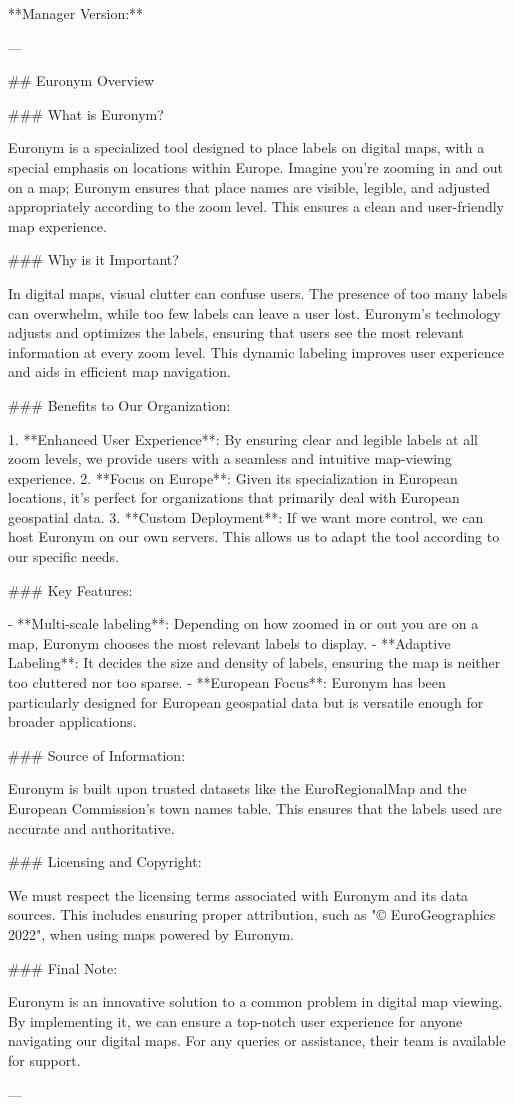 **Manager Version:**

---

## Euronym Overview

### What is Euronym?

Euronym is a specialized tool designed to place labels on digital maps, with a special emphasis on locations within Europe. Imagine you're zooming in and out on a map; Euronym ensures that place names are visible, legible, and adjusted appropriately according to the zoom level. This ensures a clean and user-friendly map experience.

### Why is it Important?

In digital maps, visual clutter can confuse users. The presence of too many labels can overwhelm, while too few labels can leave a user lost. Euronym's technology adjusts and optimizes the labels, ensuring that users see the most relevant information at every zoom level. This dynamic labeling improves user experience and aids in efficient map navigation.

### Benefits to Our Organization:

1. **Enhanced User Experience**: By ensuring clear and legible labels at all zoom levels, we provide users with a seamless and intuitive map-viewing experience.
2. **Focus on Europe**: Given its specialization in European locations, it's perfect for organizations that primarily deal with European geospatial data.
3. **Custom Deployment**: If we want more control, we can host Euronym on our own servers. This allows us to adapt the tool according to our specific needs.

### Key Features:

- **Multi-scale labeling**: Depending on how zoomed in or out you are on a map, Euronym chooses the most relevant labels to display.
- **Adaptive Labeling**: It decides the size and density of labels, ensuring the map is neither too cluttered nor too sparse.
- **European Focus**: Euronym has been particularly designed for European geospatial data but is versatile enough for broader applications.

### Source of Information:

Euronym is built upon trusted datasets like the EuroRegionalMap and the European Commission's town names table. This ensures that the labels used are accurate and authoritative.

### Licensing and Copyright:

We must respect the licensing terms associated with Euronym and its data sources. This includes ensuring proper attribution, such as "© EuroGeographics 2022", when using maps powered by Euronym.

### Final Note:

Euronym is an innovative solution to a common problem in digital map viewing. By implementing it, we can ensure a top-notch user experience for anyone navigating our digital maps. For any queries or assistance, their team is available for support.

---